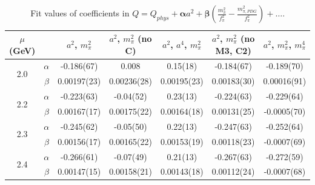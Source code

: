 \documentclass[12pt]{extarticle}
\begin{document}
\begin{table}[h!]
\begin{center}
\begin{tabular}{|c c|c|c|c|c|c|}
\hline
$\mu$ (GeV) &  & $a^2$, $m_\pi^2$& $a^2$, $m_\pi^2$ (no C)& $a^2$, $a^4$, $m_\pi^2$& $a^2$, $m_\pi^2$ (no M3, C2)& $a^2$, $m_\pi^2$, $m_\pi^4$\\
\hline
\multirow{2}{0.5in}{2.0} & $\alpha$ & -0.186(67)& 0.008& 0.15(18)& -0.184(67)& -0.189(70)\\
 & $\beta$ & 0.00197(23)& 0.00236(28)& 0.00195(23)& 0.00183(30)& 0.00016(91)\\
\hline
\multirow{2}{0.5in}{2.2} & $\alpha$ & -0.223(63)& -0.04(52)& 0.23(13)& -0.224(63)& -0.229(64)\\
 & $\beta$ & 0.00167(17)& 0.00175(22)& 0.00164(18)& 0.00131(25)& -0.0005(70)\\
\hline
\multirow{2}{0.5in}{2.3} & $\alpha$ & -0.245(62)& -0.05(50)& 0.22(13)& -0.247(63)& -0.252(64)\\
 & $\beta$ & 0.00156(17)& 0.00165(22)& 0.00153(19)& 0.00118(23)& -0.0007(69)\\
\hline
\multirow{2}{0.5in}{2.4} & $\alpha$ & -0.266(61)& -0.07(49)& 0.21(13)& -0.267(63)& -0.272(59)\\
 & $\beta$ & 0.00147(15)& 0.00158(21)& 0.00143(18)& 0.00112(24)& -0.0007(68)\\
\hline
\end{tabular}
\caption{Fit values of coefficients in $Q = Q_{phys} + \mathbf{\alpha} a^2 + \mathbf{\beta}\left(\frac{m_\pi^2}{f_\pi^2}-\frac{m_{\pi,PDG}^2}{f_\pi^2}\right) + \ldots$.}
\end{center}
\end{table}




















\clearpage
\end{document}
